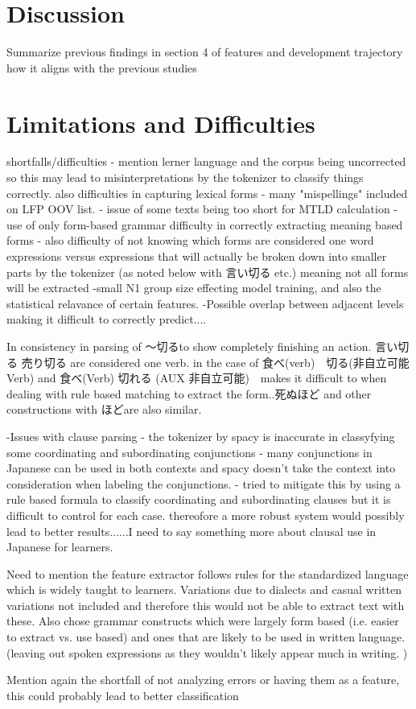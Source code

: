 \section{Discussion}
Summarize previous findings in section 4 of features and development trajectory how it aligns with the previous studies




\section{Limitations and Difficulties}
shortfalls/difficulties
- mention lerner language and the corpus being uncorrected so this may lead to misinterpretations by the tokenizer to classify things correctly.
    also difficulties in capturing lexical forms - many "mispellings" included on LFP OOV list.
- issue of some texts being too short for MTLD calculation
- use of only form-based grammar difficulty in correctly extracting meaning based forms
- also difficulty of not knowing which forms are considered one word expressions versus expressions that will
actually be broken down into smaller parts by the tokenizer (as noted below with 言い切る etc.) meaning not all forms
will be extracted
-small N1 group size effecting model training, and also the statistical relavance of certain features.
-Possible overlap between adjacent levels making it difficult to correctly predict....

In consistency in parsing of 〜切るto show completely finishing an action. 言い切る 売り切る are considered one verb. in the
case of 食べ(verb)　切る(非自立可能Verb) and 食べ(Verb) 切れる (AUX 非自立可能)　makes it difficult to when dealing with rule based
matching to extract the form..死ぬほど and other constructions with ほどare also similar.

-Issues with clause parsing - the tokenizer by spacy is inaccurate in classyfying some coordinating and
subordinating conjunctions - many conjunctions in Japanese can be used in both contexts and spacy doesn't take the
context into consideration when labeling the conjunctions. - tried to mitigate this by using a rule based formula to
classify coordinating and subordinating clauses but it is difficult to control for each case. thereofore a more
robust system would possibly lead to better results......I need to say something more about clausal use in Japanese
for learners.


Need to mention the feature extractor follows rules for the standardized language which is widely taught to
learners. Variations due to dialects and casual written variations not included and therefore this would not be
able to extract text with these. Also chose grammar constructs which were largely form based (i.e. easier to extract
vs. use based) and ones that are likely to be used in written language. (leaving out spoken expressions as they
wouldn't likely appear much in writing. )

Mention again the shortfall of not analyzing errors or having them as a feature, this could probably lead to better
classification